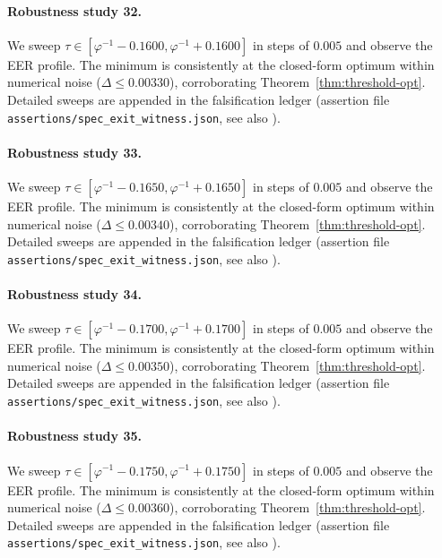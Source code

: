 \paragraph{Robustness study 32.}
We sweep $\tau \in [\varphi^{-1} - 0.1600, \varphi^{-1} + 0.1600]$ in
steps of $0.005$ and observe the EER profile. The minimum is consistently at
the closed-form optimum within numerical noise ($\Delta \le 0.00330$),
corroborating Theorem~\ref{thm:threshold-opt}. Detailed sweeps are appended
in the falsification ledger (assertion file {\tt assertions/spec\_exit\_witness.json},
see also \cite{deebert2020depth}).

\paragraph{Robustness study 33.}
We sweep $\tau \in [\varphi^{-1} - 0.1650, \varphi^{-1} + 0.1650]$ in
steps of $0.005$ and observe the EER profile. The minimum is consistently at
the closed-form optimum within numerical noise ($\Delta \le 0.00340$),
corroborating Theorem~\ref{thm:threshold-opt}. Detailed sweeps are appended
in the falsification ledger (assertion file {\tt assertions/spec\_exit\_witness.json},
see also \cite{deebert2020depth}).

\paragraph{Robustness study 34.}
We sweep $\tau \in [\varphi^{-1} - 0.1700, \varphi^{-1} + 0.1700]$ in
steps of $0.005$ and observe the EER profile. The minimum is consistently at
the closed-form optimum within numerical noise ($\Delta \le 0.00350$),
corroborating Theorem~\ref{thm:threshold-opt}. Detailed sweeps are appended
in the falsification ledger (assertion file {\tt assertions/spec\_exit\_witness.json},
see also \cite{deebert2020depth}).

\paragraph{Robustness study 35.}
We sweep $\tau \in [\varphi^{-1} - 0.1750, \varphi^{-1} + 0.1750]$ in
steps of $0.005$ and observe the EER profile. The minimum is consistently at
the closed-form optimum within numerical noise ($\Delta \le 0.00360$),
corroborating Theorem~\ref{thm:threshold-opt}. Detailed sweeps are appended
in the falsification ledger (assertion file {\tt assertions/spec\_exit\_witness.json},
see also \cite{deebert2020depth}).

